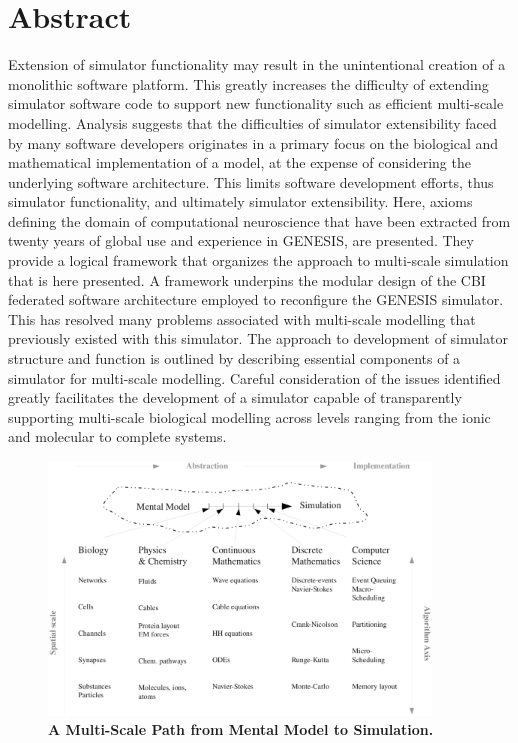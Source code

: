 \documentclass[12pt]{article}
\begin{document}
\section*{Abstract}

Extension of simulator functionality may result in the unintentional creation of a monolithic software platform. This greatly increases the difficulty of extending simulator software code to support new functionality such as efficient multi-scale modelling. Analysis suggests that the difficulties of simulator extensibility faced by many software developers originates in a primary focus on the biological and mathematical implementation of a model, at the expense of considering the underlying software architecture. This limits software development efforts, thus simulator functionality, and ultimately simulator extensibility. Here, axioms defining the domain of computational neuroscience that have been extracted from twenty years of global use and experience in GENESIS, are presented. They provide a logical framework that organizes the approach to multi-scale simulation that is here presented. A framework underpins the modular design of the CBI federated software architecture employed to reconfigure the GENESIS simulator. This has resolved many problems associated with multi-scale modelling that previously existed with this simulator. The approach to development of simulator structure and function is outlined by describing essential components of a simulator for multi-scale modelling. Careful consideration of the issues identified greatly facilitates the development of a simulator capable of transparently supporting multi-scale biological modelling across levels ranging from the ionic and molecular to complete systems.

\begin{figure}[h!t]
  \begin{center}
    \includegraphics[width=4in]{figures/NS-abstraction-implementation.eps}
  \end{center}
  \caption{ {\bf A Multi-Scale Path from Mental Model to Simulation.} }
  \label{fig:mental-model-simulation-path}
\end{figure}
\end{document}

